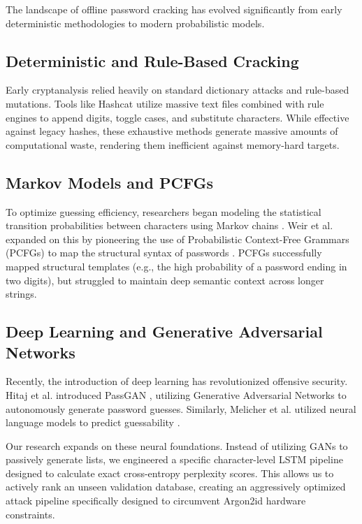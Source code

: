 \documentclass[conference]{IEEEtran}
\begin{document}
The landscape of offline password cracking has evolved significantly from early deterministic methodologies to modern probabilistic models.

\subsection{Deterministic and Rule-Based Cracking}
Early cryptanalysis relied heavily on standard dictionary attacks and rule-based mutations. Tools like Hashcat \cite{hashcat} utilize massive text files combined with rule engines to append digits, toggle cases, and substitute characters. While effective against legacy hashes, these exhaustive methods generate massive amounts of computational waste, rendering them inefficient against memory-hard targets.

\subsection{Markov Models and PCFGs}
To optimize guessing efficiency, researchers began modeling the statistical transition probabilities between characters using Markov chains \cite{narayanan2015}. Weir et al. expanded on this by pioneering the use of Probabilistic Context-Free Grammars (PCFGs) to map the structural syntax of passwords \cite{weir2009}. PCFGs successfully mapped structural templates (e.g., the high probability of a password ending in two digits), but struggled to maintain deep semantic context across longer strings.

\subsection{Deep Learning and Generative Adversarial Networks}
Recently, the introduction of deep learning has revolutionized offensive security. Hitaj et al. introduced PassGAN \cite{hitaj2019}, utilizing Generative Adversarial Networks to autonomously generate password guesses. Similarly, Melicher et al. utilized neural language models to predict guessability \cite{melicher2016}. 

Our research expands on these neural foundations. Instead of utilizing GANs to passively generate lists, we engineered a specific character-level LSTM pipeline designed to calculate exact cross-entropy perplexity scores. This allows us to actively rank an unseen validation database, creating an aggressively optimized attack pipeline specifically designed to circumvent Argon2id hardware constraints.
\end{document}
